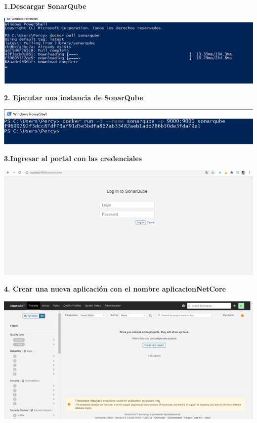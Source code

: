 \documentclass[12pt,letterpaper]{article}
\begin{document}
\textbf{1.Descargar SonarQube}

    \begin{center}
		\includegraphics[width=15cm]{./Imagenes/1} 
	\end{center}

\textbf{2. Ejecutar una instancia de SonarQube}

    \begin{center}
		\includegraphics[width=15cm]{./Imagenes/2} 
	\end{center}
  
  
\textbf{3.Ingresar al portal con las credenciales}

    \begin{center}
		\includegraphics[width=15cm]{./Imagenes/3} 
	\end{center}

\textbf{4. Crear una nueva aplicación con el nombre aplicacionNetCore}

    \begin{center}
		\includegraphics[width=15cm]{./Imagenes/4} 
	\end{center}
	
\end{document}
